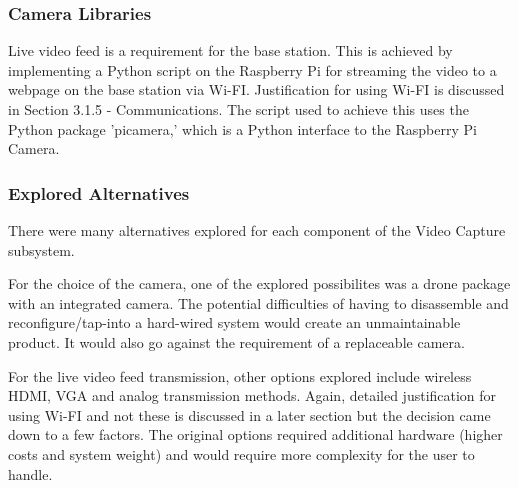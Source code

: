 \subsubsection{Camera Libraries}
Live video feed is a requirement for the base station. This is achieved by implementing a Python script on the Raspberry Pi for streaming the video to a webpage on the base station via Wi-FI. Justification for using Wi-FI is discussed in Section 3.1.5 - Communications. The script used to achieve this uses the Python package 'picamera,' which is a Python interface to the Raspberry Pi Camera. 

\subsubsection{Explored Alternatives}
There were many alternatives explored for each component of the Video Capture subsystem.

For the choice of the camera, one of the explored possibilites was a drone package with an integrated camera. The potential difficulties of having to disassemble and reconfigure/tap-into a hard-wired system would create an unmaintainable product. It would also go against the requirement of a replaceable camera.

For the live video feed transmission, other options explored include wireless HDMI, VGA and analog transmission methods. Again, detailed justification for using Wi-FI and not these is discussed in a later section but the decision came down to a few factors. The original options required additional hardware (higher costs and system weight) and would require more complexity for the user to handle.
